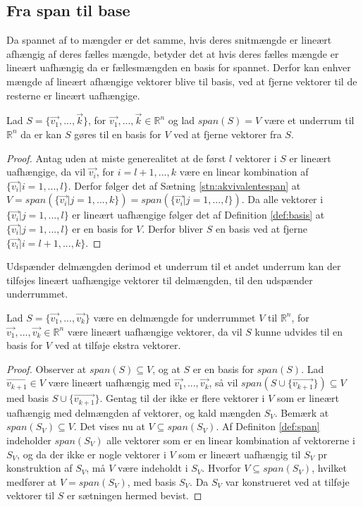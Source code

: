 \subsection{Fra span til base}
Da spannet af to mængder er det samme, hvis deres snitmængde er lineært afhængig af deres fælles mængde, betyder det at hvis deres fælles mængde er lineært uafhængig da er fællesmængden en basis for spannet.
Derfor kan enhver mængde af lineært afhængige vektorer blive til basis, ved at fjerne vektorer til de resterne er lineært uafhængige.
\begin{stn}
Lad $S=\{\vec{v_1}, ..., \vec{k}\}$, for $\vec{v_1}, ..., \vec{k} \in \mathds{R}^n$ og lad $span(S) = V$ være et underrum til $\mathds{R}^n$ da er kan $S$ gøres til en basis for $V$ ved at fjerne vektorer fra $S$.
\label{stn:reduceringbasis}
\end{stn}
\begin{proof}
Antag uden at miste generealitet at de først $l$ vektorer i $S$ er  lineært uafhængige, da vil $\vec{v_i}$, for $i = l+1,...,k$ være en linear kombination af $\{\vec{v_i} | i = 1,...,l\}$. 
Derfor følger det af Sætning \ref{stn:akvivalentespan} at $V = span(\{\vec{v_i}| j =1,...,k\}) =span(\{\vec{v_i}| j=1,...,l\})$.
Da alle vektorer i $\{\vec{v_i}| j=1,...,l\}$ er lineært uafhængige følger det af Definition \ref{def:basis} at $\{\vec{v_i}| j=1,...,l\}$ er en basis for $V$. 
Derfor bliver $S$ en basis ved at fjerne $\{\vec{v_i}| i = l+1,...,k\}$.
\end{proof}
Udspænder delmængden derimod et underrum til et andet underrum kan der tilføjes lineært uafhængige vektorer til delmængden, til den udspænder underrummet.
\begin{stn}
Lad $S=\{\vec{v_1}, ..., \vec{v_k}\}$ være en delmængde for underrummet $V$ til $\mathds{R}^n$, for $\vec{v_1}, ..., \vec{v_k} \in \mathds{R}^n$ være lineært uafhængige vektorer, da vil $S$ kunne udvides til en basis for $V$ ved at tilføje ekstra vektorer.
\end{stn}
\begin{proof}
Observer at $span(S) \subseteq V$, og at $S$ er en basis for $span(S)$.
Lad $\vec{v_{k+1}} \in V$ være lineært uafhængig med $\vec{v_1}, ..., \vec{v_k}$, så vil $span(S\cup\{\vec{v_{k+1}}\}) \subseteq V$ med basis $S\cup\{\vec{v_{k+1}}\}$. 
Gentag til der ikke er flere vektorer i $V$ som er lineært uafhængig med delmængden af vektorer, og kald mængden $S_V$.
Bemærk at $span(S_V) \subseteq V$.
Det vises nu at $V \subseteq span(S_V)$. 
Af Definiton \ref{def:span} indeholder $span(S_V)$ alle vektorer som er en linear kombination af vektorerne i $S_V$, og da der ikke er nogle vektorer i $V$ som er lineært uafhængig til $S_V$ pr konstruktion af $S_V$, må $V$ være indeholdt i $S_V$. 
Hvorfor $V \subseteq span(S_V)$, hvilket medfører at $V = span(S_V)$, med basis $S_V$. 
Da $S_V$ var konstrueret ved at tilføje vektorer til $S$ er sætningen hermed bevist.
\end{proof}
